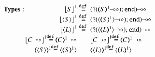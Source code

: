 \begin{figure}[t]
\[
\begin{array}{rcll}
\noindent{\bf Types:}\quad\quad\quad\quad\quad\quad
	\vtmap{{S}}{1}	&\!\!\!\!\!\!\defeq\!\!\!\!\!\!&	\lhot{(\btinp{\lhot{\tmap{S}{1}}} \tinact)} \\
	\vtmap{\chtype{S}}{1}&\!\!\!\!\!\!\defeq\!\!\!\!\!\!&	\lhot{(\btinp{\shot{\chtype{\tmap{S}{1}}}} \tinact)}  \\
	\vtmap{\chtype{L}}{1}&\!\!\!\!\!\!\defeq\!\!\!\!\!\!&	\lhot{(\btinp{\shot{\chtype{\tmap{L}{1}}}} \tinact)} \\
	\vtmap{\lhot{C}}{1} \!\!\defeq\!\! \lhot{\tmap{C}{1}}&& 
	\vtmap{\shot{C}}{1} \!\!\defeq\!\! \shot{\tmap{C}{1}}\\
	\tmap{\chtype{S}}{1} \!\!\defeq\!\!	\chtype{\tmap{S}{1}}  &&
	\tmap{\chtype{L}}{1} \!\!\defeq\!\!	\chtype{\tmap{L}{1}}  \\


\end{array}\]
\end{figure}
